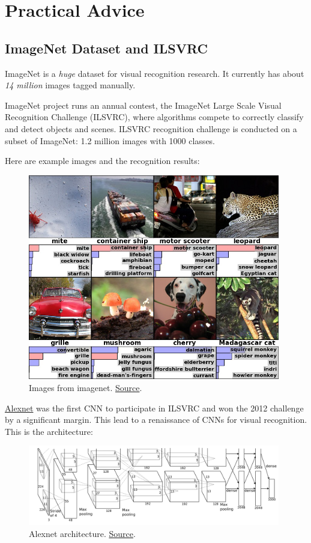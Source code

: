 \documentclass[a4paper]{tufte-handout}
\begin{document}
\section{Practical Advice}\label{practical-advice}

\subsection{ImageNet Dataset and
ILSVRC}\label{imagenet-dataset-and-ilsvrc}

ImageNet is a \emph{huge} dataset for visual recognition research. It
currently has about \emph{14 million} images tagged manually.

ImageNet project runs an annual contest, the ImageNet Large
Scale Visual Recognition Challenge (ILSVRC), where algorithms compete
 to correctly classify and detect objects and scenes. ILSVRC
recognition challenge is conducted on a subset of ImageNet: 1.2 million
images with 1000 classes.

Here are example images and the recognition results:
\begin{figure}
\includegraphics[width=110mm]{imagenet.png}
\caption{Images from imagenet.
\href{http://mappingignorance.org/fx/media/2013/04/Deep-learning-5.png}{Source}.
}  
\end{figure}


\href{https://papers.nips.cc/paper/4824-imagenet-classification-with-deep-convolutional-neural-networks.pdf}{Alexnet}
was the first CNN to participate in ILSVRC and won the 2012 challenge by
a significant margin. This lead to a renaissance of CNNs for visual
recognition. This is the architecture:
\begin{figure}
\includegraphics[width=110mm]{alexnet.png}
\caption{Alexnet architecture.
\href{http://mappingignorance.org/fx/media/2013/04/Deep-learning-5.png}{Source}.
}  
\end{figure}
\end{document}
